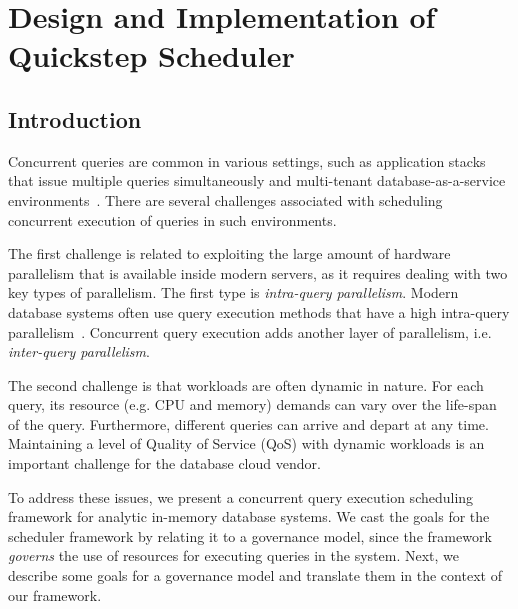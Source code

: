 \chapter{Design and Implementation of Quickstep Scheduler}

\section{Introduction}\label{sec:intro}
Concurrent queries are common in various settings, such as application stacks that issue multiple queries simultaneously and multi-tenant database-as-a-service environments~\cite{NarasayyaMSLSC15, NarasayyaDSCC13}.
There are several challenges associated with scheduling  concurrent execution of queries in such environments.

The first challenge is related to exploiting the large amount of hardware parallelism that is available inside modern servers, as it requires dealing with two key types of parallelism.
The first type is \textit{intra-query parallelism}. 
Modern database systems often use query execution methods that have a high intra-query parallelism~\cite{qsstorage,morsel,wang2016elastic}.
Concurrent query execution adds another layer of parallelism, i.e. \textit{inter-query parallelism}. 

The second challenge is that workloads are often dynamic in nature. 
For each query, its resource (e.g. CPU and memory) demands can vary over the life-span of the query. 
Furthermore, different queries can arrive and depart at any time. %
Maintaining a  level of Quality of Service (QoS) with dynamic workloads is an important challenge for the database cloud vendor. 


To address these issues, we present a concurrent query execution scheduling framework for analytic in-memory database systems. 
We cast the goals for the scheduler framework by relating it to a governance model, since
the framework \textit{governs} the use of resources for executing queries in the system. 
Next, we describe some goals for a governance model and translate them in the context of our framework.  


